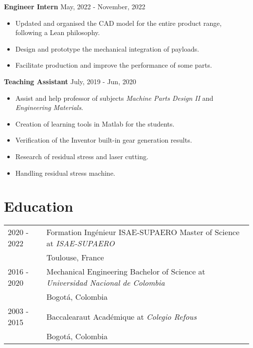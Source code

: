 \documentclass[a4paper,12pt]{article}
\begin{document}
\textbf{Engineer Intern} \hfill May, 2022 - November, 2022 \par
\normalsize{
\begin{itemize}
    \item Updated and organised the CAD model for the entire product range, following a Lean philosophy.
    \item Design and prototype the mechanical integration of payloads.
    \item Facilitate production and improve the performance of some parts.
\end{itemize}
}
\par
 
\textbf{Teaching Assistant} \hfill July, 2019 - Jun, 2020 \par
\normalsize{
\begin{itemize}
    \item Assist and help professor of subjects \textit{Machine Parts Design II} and \textit{Engineering Materials}.
    \item Creation of learning tools in Matlab for the students.
    \item Verification of the Inventor built-in gear generation results.
    \item Research of residual stress and laser cutting.
    \item Handling residual stress machine.
\end{itemize}
}



\section{Education}
\begin{tabularx}{\linewidth}{@{}l X@{}}	
2020 - 2022  & Formation Ingénieur ISAE-SUPAERO Master of Science at \textit{ISAE-SUPAERO}\\
& Toulouse, France \\

2016 - 2020 & Mechanical Engineering Bachelor of Science at \textit{Universidad Nacional de Colombia} \\ 
 & Bogotá, Colombia\\

2003 - 2015 & Baccalearaut Académique at \textit{Colegio Refous}\\ 
& Bogotá, Colombia\\
\end{tabularx}
\end{document}
